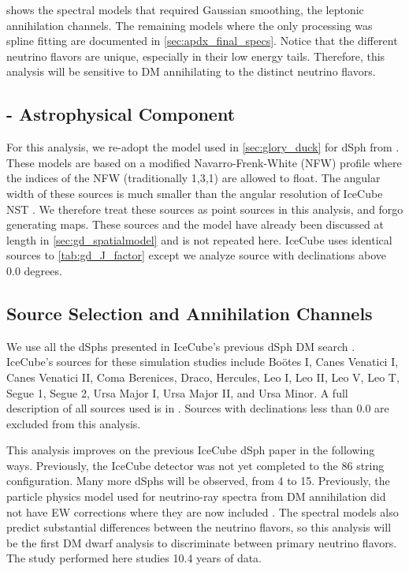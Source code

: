  shows the spectral models that required Gaussian smoothing, the leptonic annihilation channels.
The remaining models where the only processing was spline fitting are documented in \cref{sec:apdx_final_specs}.
Notice that the different neutrino flavors are unique, especially in their low energy tails.
Therefore, this analysis will be sensitive to DM annihilating to the distinct neutrino flavors.

\subsection{\J - Astrophysical Component}\label{sec:icDM_spatialmodel}

For this analysis, we re-adopt the \GS model used in \cref{sec:glory_duck} for dSph from \cite{Geringer_Sameth_2015}.
These models are based on a modified Navarro-Frenk-White (NFW) profile where the indices of the NFW (traditionally 1,3,1) are allowed to float.
The angular width of these sources is much smaller than the angular resolution of IceCube NST \cite{IC_NGC1068}.
We therefore treat these sources as point sources in this analysis, and forgo generating maps.
These sources and the \GS model have already been discussed at length in \cref{sec:gd_spatialmodel} and is not repeated here.
IceCube uses identical sources to \cref{tab:gd_J_factor} except we analyze source with declinations above 0.0 degrees.

\subsection{Source Selection and Annihilation Channels}\label{sec:ic3_study_selection}

We use all the dSphs presented in IceCube's previous dSph DM search \cite{IC3_DM2013}.
IceCube's sources for these simulation studies include Boötes I, Canes Venatici I, Canes Venatici II, Coma Berenices, Draco, Hercules, Leo I, Leo II, Leo V, Leo T, Segue 1, Segue 2, Ursa Major I, Ursa Major II,  and Ursa Minor.
A full description of all sources used is in .
Sources with declinations less than 0.0 are excluded from this analysis.

This analysis improves on the previous IceCube dSph paper \cite{IC3_DM2013} in the following ways.
Previously, the IceCube detector was not yet completed to the 86 string configuration.
Many more dSphs will be observed, from 4 to 15.
Previously, the particle physics model used for neutrino-ray spectra from DM annihilation did not have EW corrections where they are now included \cite{HDMSpectra}.
The spectral models also predict substantial differences between the neutrino flavors, so this analysis will be the first DM dwarf analysis to discriminate between primary neutrino flavors.
The study performed here studies 10.4 years of data.

